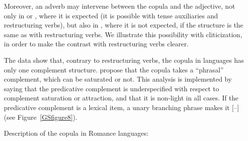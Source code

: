 Moreover, an adverb may intervene between the copula and the adjective, not only in  or , where it is expected (it is possible with tense auxiliaries and restructuring verbs), but also in , where it is not expected, if the structure is the same as with restructuring verbs. We illustrate this possibility with cliticization, in order to make the contrast with restructuring verbs clearer.

\eal
	\label{GSexemple34} 
	\label{GSexemple34a}

	\label{GSexemple34b}
		
	\label{GSexemple34c}
\zl

The data show that, contrary to restructuring verbs, the copula in  languages has only
one complement structure. \citet{AG2002b-u,AG2010} propose that the copula takes a ``phrasal''
complement, which can be saturated or not. This analysis is implemented by saying that the
predicative complement is underspecified with respect to complement saturation or attraction, and
that it is non-light in all cases. If the predicative complement is a lexical item, a unary
branching phrase makes it [\light{}$–$] (see Figure~\ref{GSfigure8}).

\eas
Description of the copula in Romance languages: \\
\label{GSexemple35}
\zs


